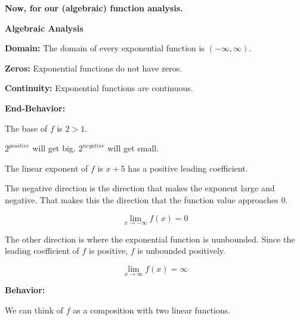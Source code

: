 \documentclass{ximera}
\begin{document}
\begin{example}
\begin{image}
\end{image}








\textbf{\textcolor{red!75!green}{Now, for our (algebraic) function analysis.}} 


\textbf{\textcolor{purple!65!blue}{Algebraic Analysis}}


\textbf{Domain:}  The domain of every exponential function is $(-\infty, \infty)$. 




\textbf{Zeros:}  Exponential functions do not have zeros. 




\textbf{Continuity:}  Exponential functions are continuous.  



\textbf{End-Behavior:} 

The base of $f$ is $2 > 1$. 



$2^{positive}$ will get big. $2^{negative}$ will get small. 

The linear exponent of $f$ is $x+5$ has a positive leading coefficient. 

The negative direction is the direction that makes the exponent large and negative.  That makes this the direction that the function value approaches $0$. 


\[
\lim\limits_{x \to -\infty} f(x) = 0
\]




The other direction is where the exponential function is uunbounded.  Since the leading coefficient of $f$ is positive, $f$ is unbounded positively. 



\[
\lim\limits_{x \to \infty} f(x) = \infty
\]









\textbf{Behavior:} 

We can think of $f$ as a composition with two linear functions.



\end{example}
\end{document}
